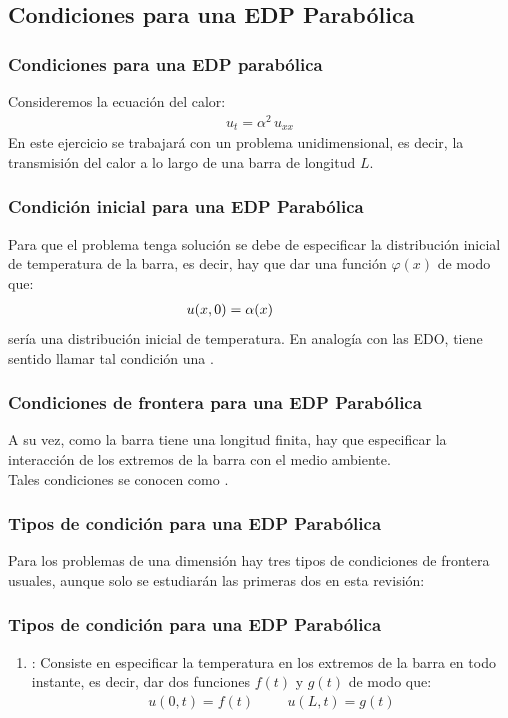 \documentclass[12pt]{beamer}
\begin{document}
\subsection{Condiciones para una EDP Parabólica}

\begin{frame}
\frametitle{Condiciones para una EDP parabólica}
Consideremos la ecuación del calor:
\pause
\begin{align*}
u_{t} =  \alpha^{2} \,  u_{xx}
\end{align*}
En este ejercicio se trabajará con un problema unidimensional, es decir, la transmisión del calor a lo largo de una barra de longitud $L$.
\end{frame}
\begin{frame}
\frametitle{Condición inicial para una EDP Parabólica}
Para que el problema tenga solución se debe de especificar la distribución inicial de temperatura de la barra, es decir, hay que dar una función $\varphi (x)$ de modo que:
\pause
\begin{align}
u (x, 0) = \alpha (x) \hspace{1.5cm} 
\label{eq:ecuacion_06_02_02}
\end{align}
sería una distribución inicial de temperatura. \pause En analogía con las EDO, tiene sentido llamar tal condición una .
\end{frame}
\begin{frame}
\frametitle{Condiciones de frontera para una EDP Parabólica}
A su vez, como la barra tiene una longitud finita, hay que especificar la interacción de los extremos de la barra con el medio ambiente.
\\
\bigskip
\pause
Tales condiciones se conocen como .
\end{frame}
\begin{frame}
\frametitle{Tipos de condición para una EDP Parabólica}
Para los problemas de una dimensión hay tres tipos de condiciones de frontera usuales, aunque solo se estudiarán las primeras dos en esta revisión:
\end{frame}
\begin{frame}
\frametitle{Tipos de condición para una EDP Parabólica}
\begin{enumerate}[<+->]
\item {}: Consiste en especificar la temperatura en los extremos de la barra en todo instante, es decir, dar dos funciones $f(t)$ y $g(t)$ de modo que:
\begin{align}
u(0, t) = f (t)  \hspace{1cm} u(L, t) = g(t)
\label{eq:ecuacion_06_02_03}    
\end{align}
\seti
\end{enumerate}
\end{frame}
\end{document}
